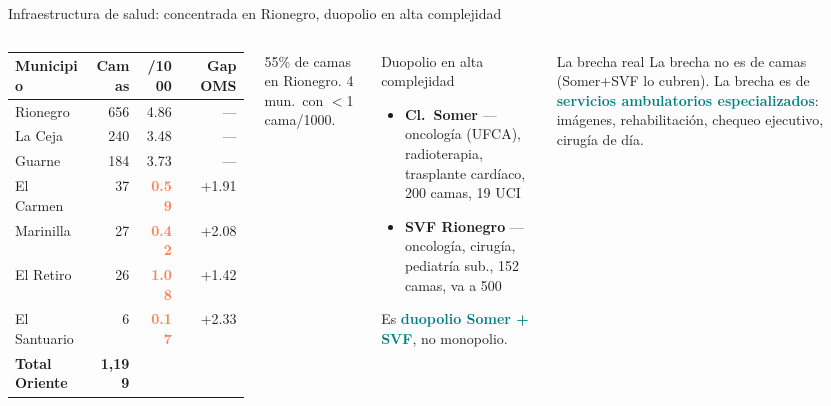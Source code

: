 \documentclass[aspectratio=169, 11pt]{beamer}
\newcommand{\highlight}[1]{\textcolor{teal}{\textbf{#1}}}
\newcommand{\danger}[1]{\textcolor{coral}{\textbf{#1}}}
\newcommand{\src}[1]{\par\vspace{2pt}{\tiny\textcolor{slate}{Fuente: #1}}}
\begin{document}
{
\begin{frame}{Infraestructura de salud: concentrada en Rionegro, duopolio en alta complejidad}
\begin{columns}[T]
{\tiny\setlength{\tabcolsep}{3pt}
\begin{tabular}{@{}lrrr@{}}
\toprule
\textbf{Municipio} & \textbf{Camas} & \textbf{/1000} & \textbf{Gap OMS} \\
\midrule
\rowcolor{teal!6}
Rionegro & 656 & 4.86 & --- \\
La Ceja & 240 & 3.48 & --- \\
Guarne & 184 & 3.73 & --- \\
\rowcolor{coral!10}
El Carmen & 37 & \danger{0.59} & +1.91 \\
\rowcolor{coral!10}
Marinilla & 27 & \danger{0.42} & +2.08 \\
\rowcolor{coral!10}
El Retiro & 26 & \danger{1.08} & +1.42 \\
\rowcolor{coral!10}
El Santuario & 6 & \danger{0.17} & +2.33 \\
\midrule
\textbf{Total Oriente} & \textbf{1,199} & & \\
\bottomrule
\end{tabular}
}
{\scriptsize 55\% de camas en Rionegro. 4 mun.\ con $<$1 cama/1000.}
\src{REPS capacidad instalada (b4dp-ximh), DANE est.\ 2026}

\begin{alertblock}{\small Duopolio en alta complejidad}
\scriptsize
\begin{itemize}\setlength{\itemsep}{1pt}
  \item \textbf{Cl.\ Somer} --- oncología (UFCA), radioterapia, trasplante cardíaco, 200 camas, 19 UCI
  \item \textbf{SVF Rionegro} --- oncología, cirugía, pediatría sub., 152 camas, va a 500
\end{itemize}
\vspace{1pt}
Es \highlight{duopolio Somer + SVF}, no monopolio.
\end{alertblock}

\vspace{2pt}
\begin{exampleblock}{\small La brecha real}
\scriptsize
La brecha no es de camas (Somer+SVF lo cubren). La brecha es de \highlight{servicios ambulatorios especializados}: imágenes, rehabilitación, chequeo ejecutivo, cirugía de día.
\end{exampleblock}
\end{columns}
\end{frame}
}
\end{document}
